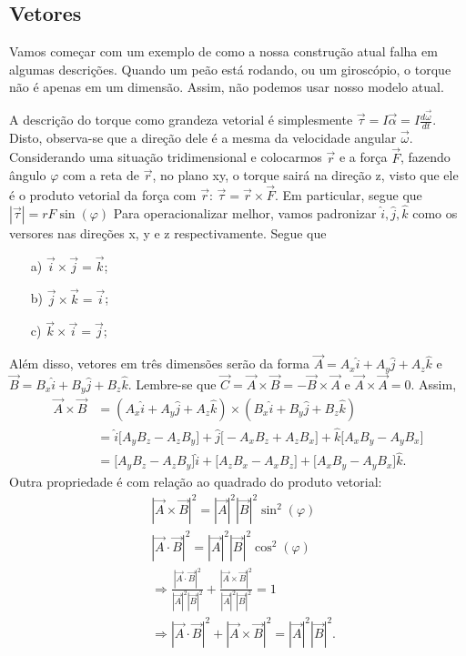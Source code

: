 \documentclass{article}
\begin{document}
\subsection{Vetores}
  Vamos começar com um exemplo de como a nossa construção atual falha em algumas descrições.
Quando um peão está rodando, ou um giroscópio, o torque não é apenas em um dimensão. Assim, não podemos usar nosso modelo atual.

  A descrição do torque como grandeza vetorial é simplesmente \(\vec{\tau } = I \vec{\alpha } = I \frac{d \vec{\omega }}{dt}\). Disto, observa-se 
que a direção dele é a mesma da velocidade angular \(\vec{\omega }\). Considerando uma situação tridimensional e colocarmos 
 \(\vec{r}\) e a força \(\vec{F}\), fazendo ângulo \(\varphi \) com a reta de \(\vec{r}\), no plano xy, o torque sairá na direção z, visto que ele é o produto vetorial da força com 
 \(\vec{r}\): \(\vec{\tau } = \vec{r}\times \vec{F}\). Em particular, segue que \(|\vec{\tau }| = rF\sin{(\varphi )}\)
Para operacionalizar melhor, vamos padronizar \(\hat{i}, \hat{j}, \hat{k}\) como os versores nas direções x, y e z respectivamente. Segue que 
\begin{itemize}
  \item[a)] \(\vec{i}\times \vec{j} = \vec{k}\);
  \item[b)] \(\vec{j}\times \vec{k} = \vec{i}\);
  \item[c)] \(\vec{k}\times \vec{i} = \vec{j}\);
\end{itemize}
  Além disso, vetores em três dimensões serão da forma \(\vec{A} = A_{x}\hat{i} + A_{y}\hat{j} + A_{z}\hat{k}\) e \(\vec{B} = B_{x}\hat{i} + B_{y}\hat{j} + B_{z}\hat{k}\). 
Lembre-se que \(\vec{C} = \vec{A} \times \vec{B} = -\vec{B}\times \vec{A}\) e \(\vec{A} \times \vec{A} = 0.\) Assim, 
\begin{align*}
  \vec{A} \times \vec{B} &= (A_{x}\hat{i} + A_{y}\hat{j} + A_{z}\hat{k})\times(B_{x}\hat{i} + B_{y}\hat{j} + B_{z}\hat{k})\\
                         &= \hat{i}\biggl[A_{y}B_{z} - A_{z}B_{y}\biggr] + \hat{j}\biggl[-A_{x}B_{z} + A_{z}B_{x}\biggr] + \hat{k}\biggl[A_{x}B_{y}-A_{y}B_{x}\biggr]\\
                         &= \biggl[A_{y}B_{z} - A_{z}B_{y}\biggr]\hat{i} + \biggl[A_{z}B_{x} - A_{x}B_{z}\biggr] + \biggl[A_{x}B_{y}-A_{y}B_{x}\biggr]\hat{k}.
\end{align*}
  Outra propriedade é com relação ao quadrado do produto vetorial:
 \begin{align*}
   &|\vec{A}\times \vec{B}|^{2} = |\vec{A}|^{2}|\vec{B}|^{2}\sin^{2}{(\varphi )}\\
   &|\vec{A}\cdot \vec{B}|^{2} = |\vec{A}|^{2}|\vec{B}|^{2}\cos^{2}{(\varphi )}\\
   &\Rightarrow \frac{|\vec{A}\cdot \vec{B}|^{2}}{|\vec{A}|^{2}|\vec{B}|^{2}} + \frac{|\vec{A}\times \vec{B}|^{2}}{|\vec{A}|^{2}|\vec{B}|^{2}} = 1\\
   &\Rightarrow  |\vec{A}\cdot \vec{B}|^{2} + |\vec{A}\times \vec{B}|^{2} = |\vec{A}|^{2}|\vec{B}|^{2}.
 \end{align*}
 \newpage
\end{document}
